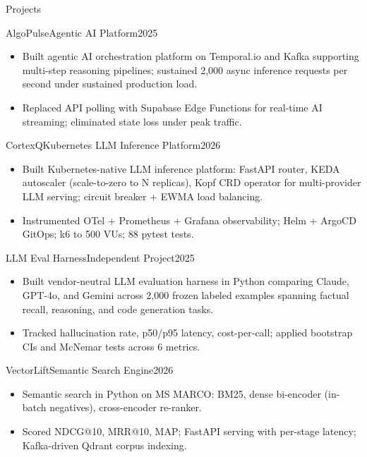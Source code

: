 \documentclass[]{mcdowellcv}
\begin{document}
\begin{cvsection}{Projects}
  \begin{cvsubsection}{AlgoPulse}{Agentic AI Platform}{2025}
    \begin{itemize}
      \item Built agentic AI orchestration platform on Temporal.io and Kafka supporting multi-step reasoning pipelines; sustained 2,000 async inference requests per second under sustained production load.
      \item Replaced API polling with Supabase Edge Functions for real-time AI streaming; eliminated state loss under peak traffic.
    \end{itemize}
    \vspace{-1.5pt}
  \end{cvsubsection}

  \begin{cvsubsection}{CortexQ}{Kubernetes LLM Inference Platform}{2026}
    \begin{itemize}
      \item Built Kubernetes-native LLM inference platform: FastAPI router, KEDA autoscaler (scale-to-zero to N replicas), Kopf CRD operator for multi-provider LLM serving; circuit breaker + EWMA load balancing.
      \item Instrumented OTel + Prometheus + Grafana observability; Helm + ArgoCD GitOps; k6 to 500 VUs; 88 pytest tests.
    \end{itemize}
    \vspace{-1.5pt}
  \end{cvsubsection}

  \begin{cvsubsection}{LLM Eval Harness}{Independent Project}{2025}
    \begin{itemize}
      \item Built vendor-neutral LLM evaluation harness in Python comparing Claude, GPT-4o, and Gemini across 2,000 frozen labeled examples spanning factual recall, reasoning, and code generation tasks.
      \item Tracked hallucination rate, p50/p95 latency, cost-per-call; applied bootstrap CIs and McNemar tests across 6 metrics.
    \end{itemize}
    \vspace{-1.5pt}
  \end{cvsubsection}

  \begin{cvsubsection}{VectorLift}{Semantic Search Engine}{2026}
    \begin{itemize}
      \item Semantic search in Python on MS MARCO: BM25, dense bi-encoder (in-batch negatives), cross-encoder re-ranker.
      \item Scored NDCG@10, MRR@10, MAP; FastAPI serving with per-stage latency; Kafka-driven Qdrant corpus indexing.
    \end{itemize}
  \end{cvsubsection}
\end{cvsection}
\end{document}
